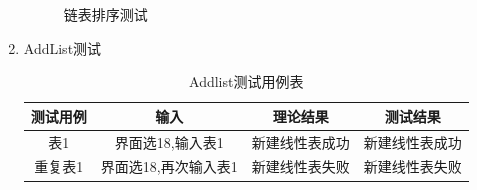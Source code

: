 \documentclass[supercite]{HustGraduPaper}
\theoremstyle{definition}
\begin{document}
\begin{enumerate}
\begin{figure}[htb]
		      \caption{链表排序测试}
	      \end{figure}
	      \newpage
	\item AddList测试
	      \begin{table}[htb]
		      \begin{center}
			      \setlength{\tabcolsep}{2.0mm}
			      \caption{Addlist测试用例表}
			      \label{table19}
			      \begin{tabular}{|c|c|c|c|}
				      \hline
				      测试用例 & 输入                 & 理论结果       & 测试结果       \\
				      \hline
				      \hline
				      表1      & 界面选18,输入表1     & 新建线性表成功 & 新建线性表成功 \\
				      \hline
				      重复表1  & 界面选18,再次输入表1 & 新建线性表失败 & 新建线性表失败 \\
				      \hline
			      \end{tabular}
		      \end{center}
	      \end{table}
	      \begin{figure}[htb]
		      \centering
		      \quad
		      \\

\end{figure}
\end{enumerate}
\end{document}
